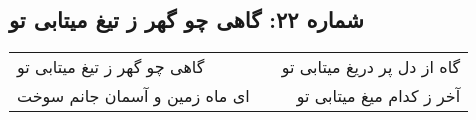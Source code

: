 \begin{center}
\section*{شماره ۲۲: گاهی چو گهر ز تیغ میتابی تو}
\label{sec:022}
\begin{longtable}{l p{0.5cm} r}
گاهی چو گهر ز تیغ میتابی تو
&&
گاه از دل پر دریغ میتابی تو
\\
ای ماه زمین و آسمان جانم سوخت
&&
آخر ز کدام میغ میتابی تو
\\
\end{longtable}
\end{center}

